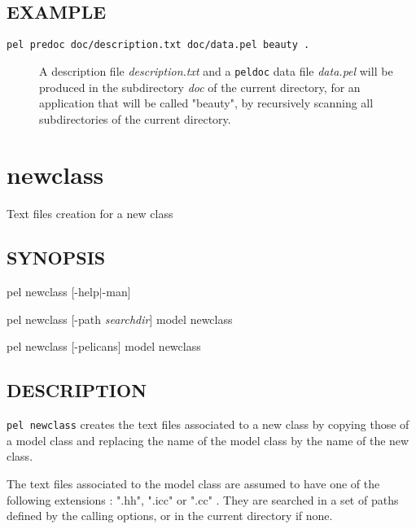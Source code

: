 \documentclass{article}
\begin{document}
\subsection*{EXAMPLE\label{predoc_EXAMPLE}}
\begin{description}

\item[\texttt{pel predoc doc/description.txt doc/data.pel beauty .}] \mbox{}

A description file \emph{description.txt} and a \texttt{peldoc} data file
\emph{data.pel} will be produced  in the subdirectory
\emph{doc} of the current directory, for an application that will be
called "beauty", by recursively scanning all subdirectories
of the current directory.

\end{description}
\clearpage
\section{newclass\label{newclass}}


Text files creation for a new class

\subsection*{SYNOPSIS\label{newclass_SYNOPSIS}}


pel newclass [-help$|$-man]



pel newclass [-path \emph{searchdir}] model newclass



pel newclass [-pelicans] model newclass

\subsection*{DESCRIPTION\label{newclass_DESCRIPTION}}


\texttt{pel newclass} creates the text files associated to
a new class by copying those of a model class
and replacing the name of the model class by the name
of the new class.



The text files associated to the model class are assumed
to have one of the following extensions : ".hh", ".icc" or ".cc" .
They are searched in a set of paths defined by the calling
options, or in the current directory if none.
\end{document}
